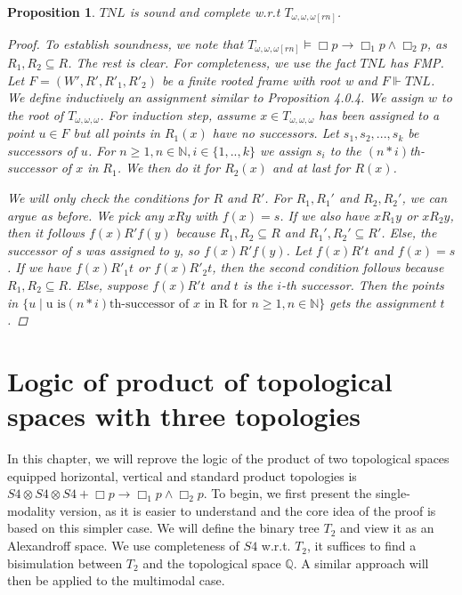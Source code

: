 \documentclass[12pt, a4paper]{scrartcl}
\newtheorem{proposition}[definition]{Proposition}
\begin{document}
\begin{proposition}
    $\mathit{TNL}$ is sound and complete w.r.t $T_{\omega,\omega,\omega[rn]}$.

    \begin{proof}
    To establish soundness, we note that $T_{\omega,\omega,\omega[rn]} \vDash \Box p \rightarrow \Box_1 p \land \Box_2p$, as $R_1,R_2 \subseteq R$. The rest is clear.
    For completeness, we use the fact $\mathit{TNL}$ has FMP. Let $F = (W',R', R'_1, R'_2)$ be a finite rooted frame with root w and $F \Vdash TNL$. We define inductively an
    assignment similar to Proposition 4.0.4. We assign $w$ to the root of $T_{\omega,\omega,\omega}$. For induction step, assume $x \in T_{\omega,\omega,\omega}$ has been assigned to a point $u \in F$ but all points in $R_1(x)$
    have no successors. Let $s_1,s_2,..., s_k$ be successors of $u$. For $n \geq 1, n \in \mathbb{N}, i \in \{1,..,k\}$ we assign $s_i$ to the $(n * i)$th-successor of $x$ in $R_1$. We then do it for $R_2(x)$ and at last for $R(x)$.

    We will only check the conditions for $R$ and $R'$. For $R_1, R_1'$ and $R_2, R_2'$, we can argue as before. We pick any $xRy$ with $f(x) = s$. 
    If we also have $xR_1y$ or $xR_2y$, then it follows $f(x)R' f(y)$ because $R_1, R_2 \subseteq R$ and $R_1', R_2' \subseteq R'$. Else, the successor of s was assigned to y, so $f(x)R'f(y)$. \newline
    Let $f(x)R't$ and $f(x) = s$. If we have $f(x) R'_1 t$ or $f(x) R'_2 t$, then the second condition follows because $R_1,R_2 \subseteq R$.
    Else, suppose $f(x)R't$ and $t$ is the $i$-th successor. Then the points in $\{u \mid \text{u is} (n*i)\text{th-successor of }x \text{ in R for } n\geq 1, n\in \mathbb{N}\}$ gets the assignment $t$.
    \end{proof}
        
\end{proposition}




\clearpage

\section{Logic of product of topological spaces with three topologies}
In this chapter, we will reprove the logic of the product of two topological spaces equipped horizontal, vertical and standard product topologies is 
$S4 \otimes S4 \otimes S4 + \Box p \rightarrow \Box_1 p \land \Box_2 p$. To begin, we first present the single-modality version, as it is easier to understand and the core idea of the proof is based on this simpler case.
We will define the binary tree $T_2$ and view it as an Alexandroff space.
We use completeness of $S4$ w.r.t. $T_2$, it suffices to find a bisimulation between $T_2$ and the topological space $\mathbb{Q}$.
A similar approach will then be applied to the multimodal case.
\end{document}
